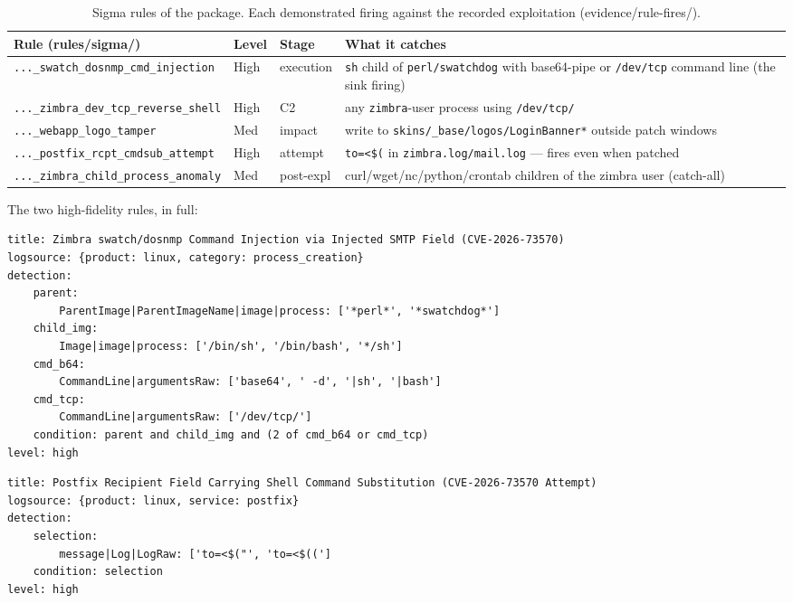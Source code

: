 \begin{table}[t]
\centering
\footnotesize
\begin{tabular}{p{5.6cm}llp{5.6cm}}
\toprule
Rule (rules/sigma/) & Level & Stage & What it catches \\
\midrule
\texttt{...\_swatch\_dosnmp\_cmd\_injection} & High & execution &
  \texttt{sh} child of \texttt{perl/swatchdog} with base64-pipe or
  \texttt{/dev/tcp} command line (the sink firing) \\
\texttt{...\_zimbra\_dev\_tcp\_reverse\_shell} & High & C2 &
  any \texttt{zimbra}-user process using \texttt{/dev/tcp/} \\
\texttt{...\_webapp\_logo\_tamper} & Med & impact &
  write to \texttt{skins/\_base/\hspace{0pt}logos/LoginBanner*} outside patch windows \\
\texttt{...\_postfix\_rcpt\_cmdsub\_attempt} & High & attempt &
  \texttt{to=<\$(} in \texttt{zimbra.log/\hspace{0pt}mail.log} — fires even when patched \\
\texttt{...\_zimbra\_child\_process\_anomaly} & Med & post-expl &
  curl/wget/nc/python/crontab children of the zimbra user (catch-all) \\
\bottomrule
\end{tabular}
\caption{Sigma rules of the package. Each demonstrated firing against the
recorded exploitation (evidence/rule-fires/).}
\label{tab:rules}
\end{table}

The two high-fidelity rules, in full:

\begin{lstlisting}[style=yargen,caption={Rule: swatch/dosnmp command injection (sink firing)}]
title: Zimbra swatch/dosnmp Command Injection via Injected SMTP Field (CVE-2026-73570)
logsource: {product: linux, category: process_creation}
detection:
    parent:
        ParentImage|ParentImageName|image|process: ['*perl*', '*swatchdog*']
    child_img:
        Image|image|process: ['/bin/sh', '/bin/bash', '*/sh']
    cmd_b64:
        CommandLine|argumentsRaw: ['base64', ' -d', '|sh', '|bash']
    cmd_tcp:
        CommandLine|argumentsRaw: ['/dev/tcp/']
    condition: parent and child_img and (2 of cmd_b64 or cmd_tcp)
level: high
\end{lstlisting}

\begin{lstlisting}[style=yargen,caption={Rule: RCPT attempt in mail logs (fires even on patched hosts)}]
title: Postfix Recipient Field Carrying Shell Command Substitution (CVE-2026-73570 Attempt)
logsource: {product: linux, service: postfix}
detection:
    selection:
        message|Log|LogRaw: ['to=<$("', 'to=<$((']
    condition: selection
level: high
\end{lstlisting}

